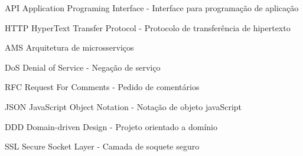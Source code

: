 
\begin{siglas}
	\item[API]{Application Programing Interface - Interface para programação de aplicação}
	\item[HTTP]{HyperText Transfer Protocol - Protocolo de transferência de hipertexto}
	\item[AMS]{Arquitetura de microsserviços}
	\item[DoS]{Denial of Service - Negação de serviço}
	\item[RFC]{Request For Comments - Pedido de comentários}
	\item[JSON]{JavaScript Object Notation - Notação de objeto javaScript}
	\item[DDD]{Domain-driven Design - Projeto orientado a domínio}
	\item[SSL]{Secure Socket Layer - Camada de soquete seguro}
\end{siglas}